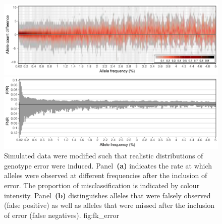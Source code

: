 

\begin{figure}[!htb]
{\footnotesize{}} \\
\includegraphics[width=\textwidth]{./img/ch4/fk_error_A_new}
{\footnotesize{}} \\
\includegraphics[width=\textwidth]{./img/ch4/fk_error_B}
{Simulated data were modified such that realistic distributions of genotype error were induced.
Panel~\textbf{{(a)}} indicates the rate at which alleles were observed at different frequencies after the inclusion of error.
The proportion of misclassification is indicated by colour intensity.
Panel~\textbf{{(b)}} distinguishes alleles that were falsely observed (false positive) as well as alleles that were missed after the inclusion of error (false negatives).}
{fig:fk_error}
\end{figure}
